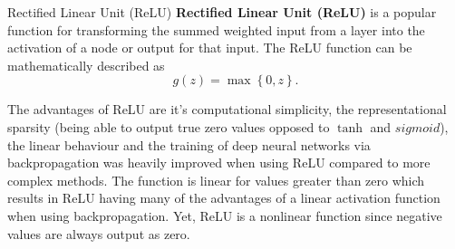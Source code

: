   \begin{pabox}{Rectified Linear Unit (ReLU)}
  \label{def:relu-definition}
    \textbf{Rectified Linear Unit (ReLU)} is a popular function for transforming the summed weighted input from a layer into the activation of a node or output for that input.
    The ReLU function can be mathematically described as $$g(z) = \max \left\{0, z\right\}.$$

  \end{pabox}
  The advantages of ReLU are it's computational simplicity, the representational sparsity (being able to output true zero values opposed to $\tanh$ and $sigmoid$), the linear behaviour and the training of deep neural networks via backpropagation was heavily improved when using ReLU compared to more complex methods. The function is linear for values greater than zero which results in ReLU having many of the advantages of a linear activation function when using backpropagation. Yet, ReLU is a nonlinear function since negative values are always output as zero.


